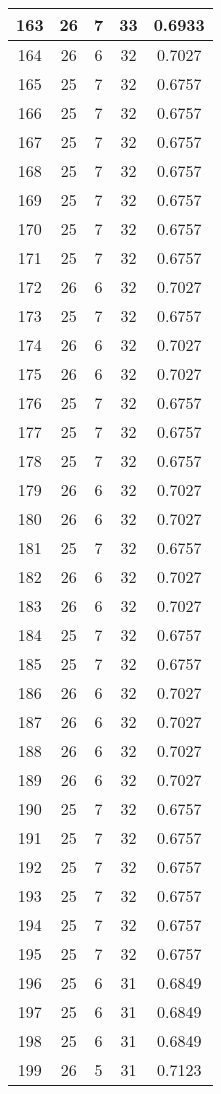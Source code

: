 \documentclass[letterpaper, 12pt]{article}
\begin{document}
\begin{longtable}{|c|c|c|c|c|}
\hline
163 & 26 & 7 & 33 & 0.6933 \\
\hline
164 & 26 & 6 & 32 & 0.7027 \\
\hline
165 & 25 & 7 & 32 & 0.6757 \\
\hline
166 & 25 & 7 & 32 & 0.6757 \\
\hline
167 & 25 & 7 & 32 & 0.6757 \\
\hline
168 & 25 & 7 & 32 & 0.6757 \\
\hline
169 & 25 & 7 & 32 & 0.6757 \\
\hline
170 & 25 & 7 & 32 & 0.6757 \\
\hline
171 & 25 & 7 & 32 & 0.6757 \\
\hline
172 & 26 & 6 & 32 & 0.7027 \\
\hline
173 & 25 & 7 & 32 & 0.6757 \\
\hline
174 & 26 & 6 & 32 & 0.7027 \\
\hline
175 & 26 & 6 & 32 & 0.7027 \\
\hline
176 & 25 & 7 & 32 & 0.6757 \\
\hline
177 & 25 & 7 & 32 & 0.6757 \\
\hline
178 & 25 & 7 & 32 & 0.6757 \\
\hline
179 & 26 & 6 & 32 & 0.7027 \\
\hline
180 & 26 & 6 & 32 & 0.7027 \\
\hline
181 & 25 & 7 & 32 & 0.6757 \\
\hline
182 & 26 & 6 & 32 & 0.7027 \\
\hline
183 & 26 & 6 & 32 & 0.7027 \\
\hline
184 & 25 & 7 & 32 & 0.6757 \\
\hline
185 & 25 & 7 & 32 & 0.6757 \\
\hline
186 & 26 & 6 & 32 & 0.7027 \\
\hline
187 & 26 & 6 & 32 & 0.7027 \\
\hline
188 & 26 & 6 & 32 & 0.7027 \\
\hline
189 & 26 & 6 & 32 & 0.7027 \\
\hline
190 & 25 & 7 & 32 & 0.6757 \\
\hline
191 & 25 & 7 & 32 & 0.6757 \\
\hline
192 & 25 & 7 & 32 & 0.6757 \\
\hline
193 & 25 & 7 & 32 & 0.6757 \\
\hline
194 & 25 & 7 & 32 & 0.6757 \\
\hline
195 & 25 & 7 & 32 & 0.6757 \\
\hline
196 & 25 & 6 & 31 & 0.6849 \\
\hline
197 & 25 & 6 & 31 & 0.6849 \\
\hline
198 & 25 & 6 & 31 & 0.6849 \\
\hline
199 & 26 & 5 & 31 & 0.7123 \\
\hline
\end{longtable}
\end{document}
